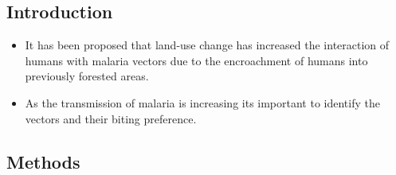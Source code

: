 \subsection*{Introduction}
\begin{itemize}
	\item It has been proposed that land-use change has increased the interaction of humans with malaria vectors due to the encroachment of humans into previously forested areas.
	\item As the transmission of malaria is increasing its important to identify the vectors and their biting preference.
\end{itemize}


\subsection*{Methods}

